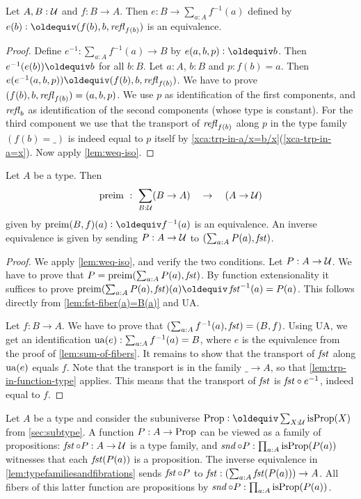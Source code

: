 \begin{definition}
\begin{lemma}\label{lem:sum-of-fibers}
Let $A,B:\mathcal{U}$ and $f:B\to A$. 
Then $e: B \to \sum_{a:A} f^{-1}(a)$ defined by
$e(b)\defeq (f(b),b,\refl{f(b)})$ is an equivalence.
\end{lemma}
\begin{proof}
Define $e^{-1}: \sum_{a:A} f^{-1}(a) \to B$ by $e(a,b,p)\defeq b$.
Then $e^{-1}(e(b))\jdeq b$ for all $b:B$.
Let $a:A$, $b:B$ and $p: f(b)=a$.
Then $e(e^{-1}(a,b,p))\jdeq (f(b),b,\refl{f(b)})$.
We have to prove $(f(b),b,\mathop{{\it refl}_{f(b)}})=(a,b,p)$.
We use $p$ as identification of the first components,
and $\mathop{{\it refl}_{b}}$ as identification of the second components
(whose type is constant). For the third component
we use that the transport of $\mathop{{\it refl}_{f(b)}}$ along $p$
in the type family $(f(b)=\_)$ is indeed equal to $p$
itself by \cref{xca:trp-in-a/x=b/x}(\ref{xca-trp-in-a=x}).
Now apply \cref{lem:weq-iso}.
\end{proof}

\begin{lemma}\label{lem:typefamiliesandfibrations}
Let $A$ be a type. Then
\[
\mathop{\mathrm{preim}} ~:~ \sum_{B:\mathcal{U}}(B\to A) \quad\to\quad (A\to\mathcal{U}) 
\] 
given by $\preim(B,f)(a)\defeq f^{-1}(a)$ is an equivalence.
An inverse equivalence is given by sending $P:A\to\mathcal{U}$ to 
$(\sum_{a:A}P(a), \mathop{\mathit{fst}})$.
\end{lemma}

\begin{proof}
We apply \cref{lem:weq-iso}, and verify the two conditions.
Let $P:A\to\mathcal{U}$. We have to prove that $P = \mathop{\mathrm{preim}}(\sum_{a:A}P(a), \mathop{\mathit{fst}})$.
By function extensionality it suffices to prove
$\preim(\sum_{a:A}P(a), \fst)(a)\jdeq \fst^{-1}(a) = P(a)$.
This follows directly from \cref{lem:fst-fiber(a)=B(a)} and UA.

Let $f: B\to A$. We have to prove that $(\sum_{a:A} f^{-1}(a), \mathop{\mathit{fst}})=(B,f)$.
Using UA, we get an identification
$\mathrm{ua}(e) : \sum_{a:A} f^{-1}(a) = B$, where $e$ is the equivalence
from the proof of \cref{lem:sum-of-fibers}. It remains
to show that the transport of $\mathop{\mathit{fst}}$ along $\mathrm{ua}(e)$ equals $f$.
Note that the transport is in the family $\_\to A$, so that
\cref{lem:trp-in-function-type} applies. This means that
the transport of $\mathop{\mathit{fst}}$ is ${\mathop{\mathit{fst}}} \circ {e^{-1}}$, indeed equal to $f$.
\end{proof}

Let $A$ be a type and consider the subuniverse 
$\Prop\defeq \sum_{X:\UU}\isprop(X)$ from \cref{sec:subtype}.
A function $P: A\to\mathord{\mathrm{Prop}}$ can be viewed as a family of propositions:
$\mathop{\mathit{fst}}\circ P : A\to \mathcal{U}$ is a type family, and
$\mathop{\mathit{snd}}\circ P : \prod_{a:A} \mathrm{isProp}(P(a))$ witnesses
that each $\mathop{\mathit{fst}}(P(a))$ is a proposition.
The inverse equivalence in \cref{lem:typefamiliesandfibrations}
sends $\mathop{\mathit{fst}}\circ P$ to $\mathop{\mathit{fst}}: (\sum_{a:A} \mathop{\mathit{fst}}(P(a))) \to A$.
All fibers of this latter function are propositions by
$\mathop{\mathit{snd}}\circ P : \prod_{a:A} \mathrm{isProp}(P(a))$. 


\end{definition}
